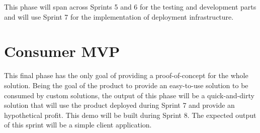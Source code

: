 This phase will span across Sprints 5 and 6 for the testing and development parts and will use Sprint 7 for the implementation of deployment infrastructure.

\section{Consumer MVP}
This final phase has the only goal of providing a proof-of-concept for the whole solution. Being the goal of the product to provide an easy-to-use solution to be consumed by custom solutions, the output of this phase will be a quick-and-dirty solution that will use the product deployed during Sprint 7 and provide an hypothetical profit. This demo will be built during Sprint 8. The expected output of this sprint will be a simple client application.